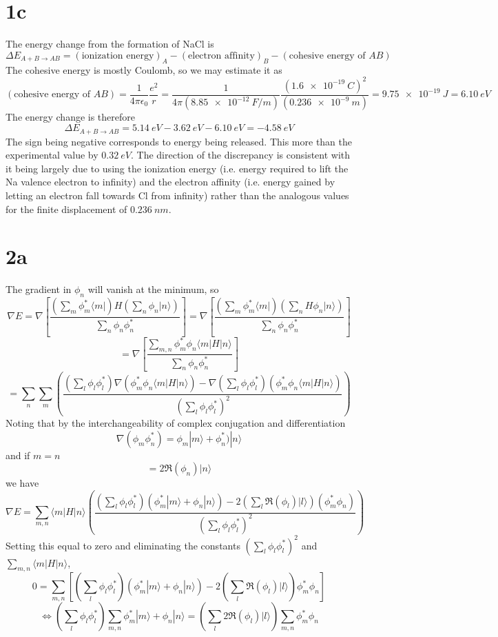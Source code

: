 \documentclass{article}
\begin{document}
\section*{1c}
The energy change from the formation of NaCl is
\[\Delta E_{A+B\rightarrow AB}=(\textrm{ionization energy})_{A}-(\textrm{electron affinity})_{B}-(\textrm{cohesive energy of }AB)\]
The cohesive energy is mostly Coulomb, so we may estimate it as
\[
  (\textrm{cohesive energy of }AB)
  =\frac{1}{4\pi\epsilon_{0}}\frac{e^{2}}{r}
  =\frac{1}{4\pi(\SI{8.85e-12}{F/m})}\frac{(\SI{1.6e-19}{C})^{2}}{(\SI{0.236e-9}{m})}
  =\SI{9.75e-19}{J}=\SI{6.10}{eV}
\]
The energy change is therefore
\[
  \Delta E_{A+B\rightarrow AB}=\SI{5.14}{eV}-\SI{3.62}{eV}-\SI{6.10}{eV}=\SI{-4.58}{eV}
\]
The sign being negative corresponds to energy being released.
This more than the experimental value by $\SI{0.32}{eV}$.
The direction of the discrepancy is consistent with it being largely due to using the ionization energy
(i.e. energy required to lift the Na valence electron to infinity) and the electron affinity
(i.e. energy gained by letting an electron fall towards Cl from infinity) rather than the analogous values for the finite displacement
of $\SI{0.236}{nm}$.

\section*{2a}
The gradient in $\phi_{n}$ will vanish at the minimum, so
\[
  \nabla E=\nabla\left[\frac{\left( \sum_{m}\phi_{m}^{*}\langle m | \right)
      H\left(\sum_{n}\phi_{n}|n\rangle \right)}
    {\sum_{n}\phi_{n}\phi_{n}^{*}}\right]
  =\nabla\left[ \frac{\left( \sum_{m}\phi_{m}^{*}\langle m| \right)\left( \sum_{n}H\phi_{n}|n\rangle \right)}
    {\sum_{n}\phi_{n}\phi_{n}^{*}} \right]
\]
\[
  =\nabla\left[ \frac{\sum_{m,n}\phi_{m}^{*}\phi_{n}\langle m|H|n \rangle}{\sum_{n}\phi_{n}\phi_{n}^{*}} \right]
\]
\[
  =\sum_{n}\sum_{m}\left(  \frac{\left( \sum_{l}\phi_{l}\phi_{l}^{*} \right)\nabla(\phi_{m}^{*}\phi_{n}\langle m|H|n \rangle)
      -\nabla(\sum_{l}\phi_{l}\phi_{l}^{*})\left( \phi_{m}^{*}\phi_{n}\langle m|H|n \rangle \right)}
    {\left(  \sum_{l}\phi_{l}\phi_{l}^{*}\right)^{2}}\right)
\]
Noting that by the interchangeability  of complex conjugation and differentiation
\[
  \nabla(\phi_{m}\phi_{n}^{*})=\phi_{m}|m\rangle+\phi_{n}^{*})|n\rangle
\]
and if $m=n$
\[
  =2\Re (\phi_{n})|n\rangle
\]
we have
\[
  \nabla E=\sum_{m,n}\langle m|H|n \rangle\left(\frac{\left( \sum_{l}\phi_{l}\phi_{l}^{*} \right)(\phi_{m}^{*}|m\rangle+\phi_{n}|n\rangle)
    -2(\sum_{l}\Re(\phi_{l})|l\rangle)(\phi_{m}^{*}\phi_{n})}{\left( \sum_{l}\phi_{l}\phi_{l}^{*}\right)^{2}} \right)
\]
Setting this equal to zero and eliminating the constants $(\sum_{l}\phi_{l}\phi_{l}^{*})^{2}$ and $\sum_{m,n}\langle m|H|n \rangle$,
\[
  0=\sum_{m,n}\left[ \left( \sum_{l}\phi_{l}\phi_{l}^{*} \right)(\phi_{m}^{*}|m\rangle+\phi_{n}|n\rangle)
  -2\left(\sum_{l}\Re(\phi_{l})|l\rangle\right)\phi_{m}^{*}\phi_{n}\right]
\]
\[
  \Leftrightarrow \left( \sum_{l}\phi_{l}\phi_{l}^{*} \right)\sum_{m,n}\phi_{m}^{*}|m\rangle+\phi_{n}|n\rangle
  =\left( \sum_{l}2\Re(\phi_{l})|l\rangle \right)\sum_{m,n} \phi_{m}^{*}\phi_{n}\]
\end{document}
